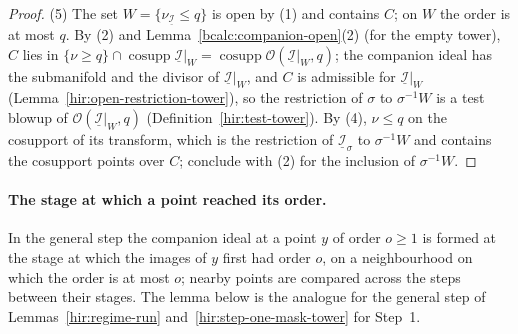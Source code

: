 \begin{proof}
(5) The set \(W=\{\nu_{\underline{\mathcal I}}\le q\}\) is open by (1) and contains \(C\); on \(W\) the order is at most \(q\). By (2) and
Lemma~\ref{bcalc:companion-open}(2) (for the empty tower), \(C\) lies in \(\{\nu\ge q\}\cap\operatorname{cosupp}\underline{\mathcal I}|_W=\operatorname{cosupp}\mathcal O(\underline{\mathcal I}|_W,q)\);
the companion ideal has the submanifold and the divisor of \(\underline{\mathcal I}|_W\), and \(C\) is admissible for \(\underline{\mathcal I}|_W\) (Lemma~\ref{hir:open-restriction-tower}),
so the restriction of \(\sigma\) to \(\sigma^{-1}W\) is a test blowup of \(\mathcal O(\underline{\mathcal I}|_W,q)\) (Definition~\ref{hir:test-tower}). By (4),
\(\nu\le q\) on the cosupport of its transform, which is the restriction of \(\underline{\mathcal I}_\sigma\) to \(\sigma^{-1}W\) and contains the cosupport points over \(C\);
conclude with (2) for the inclusion of \(\sigma^{-1}W\).
\end{proof}

\paragraph{The stage at which a point reached its order.} In the general step the companion ideal at a point \(y\) of order \(o\ge1\) is
formed at the stage at which the images of \(y\) first had order \(o\), on a neighbourhood on which the order is at most \(o\); nearby points are
compared across the steps between their stages. The lemma below is the analogue for the general step of Lemmas~\ref{hir:regime-run}
and~\ref{hir:step-one-mask-tower} for Step~1.

